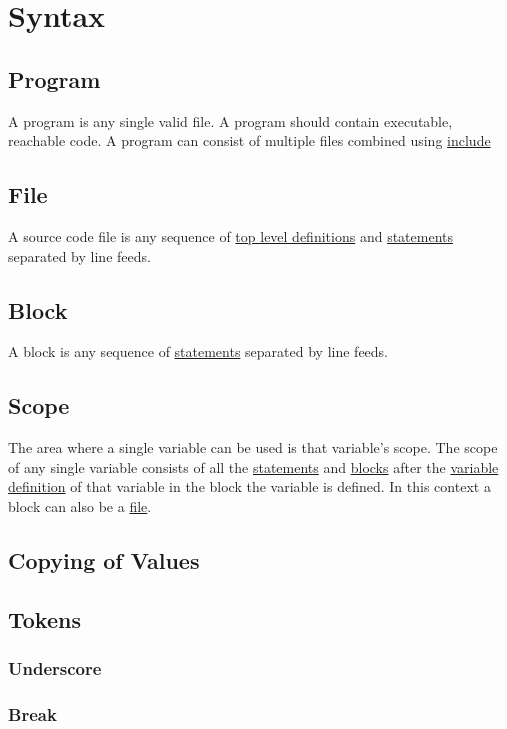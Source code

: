 \section{Syntax}
\label{syntax}

\subsection{Program}
\label{program}
A program is any single valid file.
A program should contain executable, reachable code.
A program can consist of multiple files combined using \hyperref[stat:include]{include}

\subsection{File}
\label{file}
A source code file is any sequence of \hyperref[tld]{top level definitions}
and \hyperref[statement]{statements} separated by line feeds.

\subsection{Block}
\label{block}
A block is any sequence of \hyperref[statement]{statements} separated by line feeds.

\subsection{Scope}
\label{scope}
The area where a single variable can be used is that variable's scope.
The scope of any single variable consists of all the \hyperref[statement]{statements} and \hyperref[block]{blocks}
after the \hyperref[stat:vardes]{variable definition} of that variable in the block the variable is defined.
In this context a block can also be a \hyperref[file]{file}.





\subsection{Copying of Values}
\label{copying}

\subsection{Tokens}
\label{tokens}

\subsubsection{Underscore}
\label{token:_}
\subsubsection{Break}
\label{token:break}